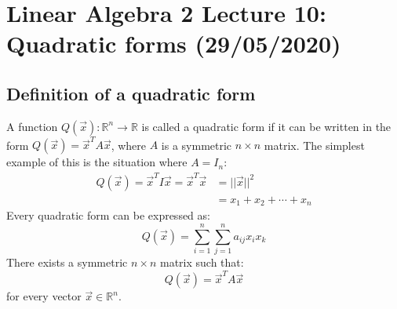 \documentclass[11pt, a4paper]{article}
\newcommand*{\R}{\ensuremath{\mathbb{R}}}
\begin{document}
\setcounter{section}{9}
\setcounter{equation}{0}

\section{Linear Algebra 2 Lecture 10: Quadratic forms (29/05/2020)}

\subsection{Definition of a quadratic form}
A function $Q(\vec{x}): \R^n \to \R$ is called a quadratic form if it can be written in the form $Q(\vec{x}) = \vec{x}^TA\vec{x}$, where $A$ is a symmetric $n \times n$ matrix. The simplest example of this is the situation where $A=I_n$:
\begin{align}
  Q(\vec{x}) = \vec{x}^TI\vec{x} = \vec{x}^T\vec{x} &= ||\vec{x}||^2\\
  &= x_1 + x_2 + \cdots + x_n
\end{align}
Every quadratic form can be expressed as:
\begin{equation}
  Q(\vec{x}) = \sum_{i=1}^n \sum_{j=1}^n a_{ij}x_ix_k
\end{equation}
There exists a symmetric $n \times n$ matrix such that:
\begin{equation}
  Q(\vec{x}) = \vec{x}^T A \vec{x}
\end{equation}
for every vector $\vec{x} \in \R^n$.
\end{document}
